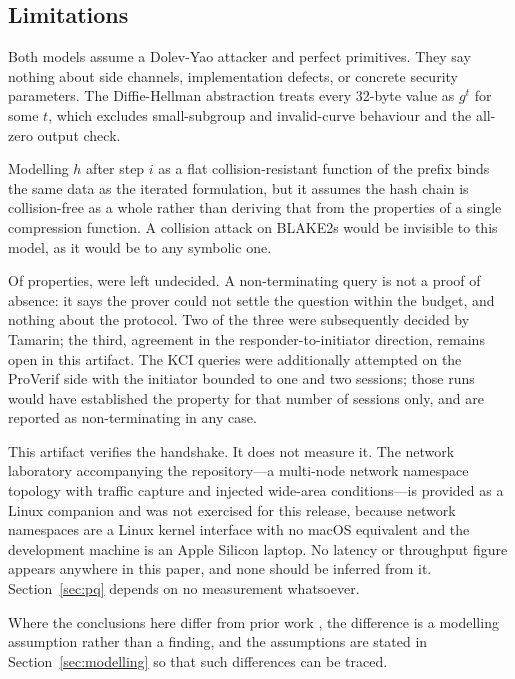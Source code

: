 \subsection{Limitations}

 Both models assume a Dolev-Yao attacker and
perfect primitives. They say nothing about side channels, implementation
defects, or concrete security parameters. The Diffie-Hellman abstraction
treats every 32-byte value as \(g^t\) for some \(t\), which excludes
small-subgroup and invalid-curve behaviour and the all-zero output check.

 Modelling \(h\) after step \(i\) as a flat
collision-resistant function of the prefix binds the same data as the iterated
formulation, but it assumes the hash chain is collision-free as a whole rather
than deriving that from the properties of a single compression function. A
collision attack on BLAKE2s would be invisible to this model, as it would be
to any symbolic one.

 Of \wgProps{} properties,
\wgNonterm{} were left undecided. A non-terminating query is not a proof of absence: it says the prover
could not settle the question within the budget, and nothing about the
protocol. Two of the three were subsequently decided by Tamarin; the third,
agreement in the responder-to-initiator direction, remains open in this
artifact. The KCI queries were additionally attempted on the ProVerif side
with the initiator bounded to one and two sessions; those runs would have
established the property for that number of sessions only, and are reported as
non-terminating in any case.

 This artifact verifies the handshake. It
does not measure it. The network laboratory accompanying the repository---a
multi-node network namespace topology with traffic capture and injected
wide-area conditions---is provided as a Linux companion and was not exercised
for this release, because network namespaces are a Linux kernel interface with
no macOS equivalent and the development machine is an Apple Silicon laptop. No
latency or throughput figure appears anywhere in this paper, and none should
be inferred from it. Section~\ref{sec:pq} depends on no measurement
whatsoever.

 Where the conclusions here differ from prior work
\cite{donenfeld2018formal,lipp2019cryptoverif}, the difference is a modelling
assumption rather than a finding, and the assumptions are stated in
Section~\ref{sec:modelling} so that such differences can be traced.
